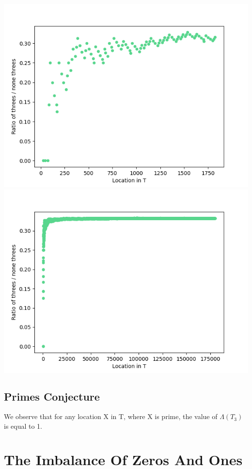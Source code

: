 \documentclass{article}
\begin{document}
\includegraphics[scale=0.4]{lambda_ratio_from_data1_ones_100}
\includegraphics[scale=0.4]{lambda_ratio_from_data1_ones_10000}

\subsection{Primes Conjecture}
We observe that for any location X in T, where X is prime, the value of $\Lambda{(T_3)}$ is equal to 1.

\section{The Imbalance Of Zeros And Ones}
\end{document}
